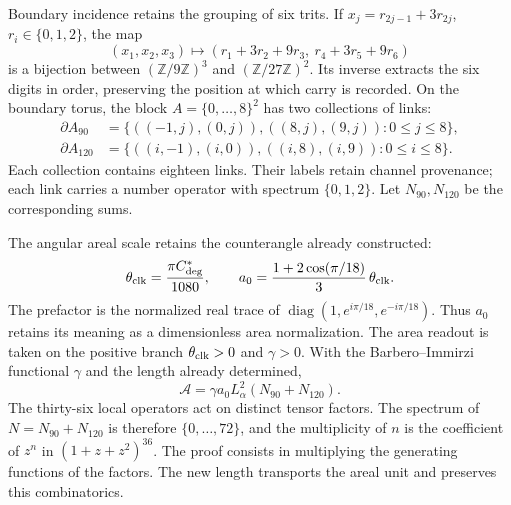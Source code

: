 Boundary incidence retains the grouping of six trits.
If $x_j=r_{2j-1}+3r_{2j}$, $r_i\in\{0,1,2\}$, the map
\[
 (x_1,x_2,x_3)\longmapsto
 (r_1+3r_2+9r_3,\ r_4+3r_5+9r_6)
\]
is a bijection between $(\mathbb Z/9\mathbb Z)^3$ and
$(\mathbb Z/27\mathbb Z)^2$. Its inverse extracts the six digits
in order, preserving the position at which carry is recorded. On the
boundary torus, the block $A=\{0,\ldots,8\}^2$ has two collections of links:
\begin{align*}
 \partial A_{90}&=\{((-1,j),(0,j)),((8,j),(9,j)):0\le j\le8\},\\
 \partial A_{120}&=\{((i,-1),(i,0)),((i,8),(i,9)):0\le i\le8\}.
\end{align*}
Each collection contains eighteen links. Their labels retain channel
provenance; each link carries a number operator with spectrum
$\{0,1,2\}$. Let $N_{90},N_{120}$ be the corresponding sums.

The angular areal scale retains the counterangle already constructed:
\[
 \theta_{\rm clk}=\frac{\pi C^*_{\deg}}{1080},\qquad
 a_0=\frac{1+2\cos(\pi/18)}3\,\theta_{\rm clk}.
\]
The prefactor is the normalized real trace of
$\operatorname{diag}(1,e^{i\pi/18},e^{-i\pi/18})$.
Thus $a_0$ retains its meaning as a dimensionless area normalization.
The area readout is taken on the positive branch
$\theta_{\rm clk}>0$ and $\gamma>0$.
With the Barbero--Immirzi functional $\gamma$ and the length already
determined,
\[
 \mathcal A=\gamma a_0L_\alpha^2(N_{90}+N_{120}).
\]
The thirty-six local operators act on distinct tensor factors.
The spectrum of $N=N_{90}+N_{120}$ is therefore
$\{0,\ldots,72\}$, and the multiplicity of $n$ is the coefficient
of $z^n$ in $(1+z+z^2)^{36}$. The proof consists in multiplying
the generating functions of the factors. The new length transports
the areal unit and preserves this combinatorics.

